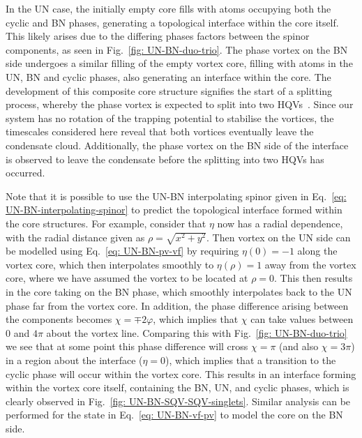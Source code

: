 In the UN case, the initially empty core fills with atoms occupying both the
cyclic and BN phases, generating a topological interface within the core itself.
This likely arises due to the differing phases factors between the spinor
components, as seen in Fig.~\ref{fig: UN-BN-duo-trio}.
The phase vortex on the BN side undergoes a similar filling of the empty vortex
core, filling with atoms in the UN, BN and cyclic phases, also generating an
interface within the core.
The development of this composite core structure signifies the start of a
splitting process, whereby the phase vortex is expected to split into two
HQVs~\cite{Seo2015, Xiao2021}.
Since our system has no rotation of the trapping potential to stabilise the
vortices, the timescales considered here reveal that both vortices eventually
leave the condensate cloud.
Additionally, the phase vortex on the BN side of the interface is observed to
leave the condensate before the splitting into two HQVs has occurred.

Note that it is possible to use the UN-BN interpolating spinor given in
Eq.~\eqref{eq: UN-BN-interpolating-spinor} to predict the topological interface
formed within the core structures.
For example, consider that \(\eta \) now has a radial dependence, with the
radial distance given as \(\rho = \sqrt{x^2 + y^2}\).
Then vortex on the UN side can be modelled using Eq.~\eqref{eq: UN-BN-pv-vf} by
requiring \(\eta(0) = -1\) along the vortex core, which then interpolates
smoothly to \(\eta(\rho) = 1\) away from the vortex core, where we have assumed
the vortex to be located at \(\rho = 0\).
This then results in the core taking on the BN phase, which smoothly
interpolates back to the UN phase far from the vortex core.
In addition, the phase difference arising between the components becomes
\(\chi = \mp 2\varphi \), which implies that \(\chi \) can take values between 0
and \(4\pi \) about the vortex line.
Comparing this with Fig.~\ref{fig: UN-BN-duo-trio} we see that at some point
this phase difference will cross \(\chi = \pi \) (and also \(\chi=3\pi \)) in a
region about the interface (\(\eta = 0\)), which implies that a
transition to the cyclic phase will occur within the vortex core.
This results in an interface forming within the vortex core itself, containing
the BN, UN, and cyclic phases, which is clearly observed in
Fig.~\ref{fig: UN-BN-SQV-SQV-singlets}.
Similar analysis can be performed for the state in Eq.~\eqref{eq: UN-BN-vf-pv}
to model the core on the BN side.

